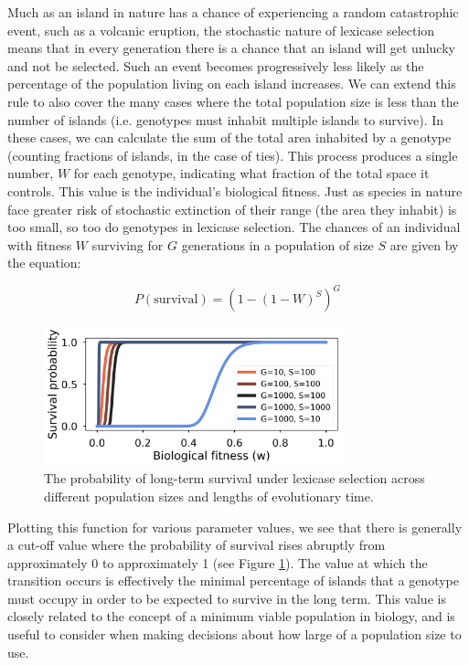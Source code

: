 Much as an island in nature has a chance of experiencing a random catastrophic event, such as a volcanic eruption, the stochastic nature of lexicase selection means that in every generation there is a chance that an island will get unlucky and not be selected. Such an event becomes progressively less likely as the percentage of the population living on each island increases. We can extend this rule to also cover the many cases where the total population size is less than the number of islands (i.e. genotypes must inhabit multiple islands to survive). In these cases, we can calculate the sum of the total area inhabited by a genotype (counting fractions of islands, in the case of ties). This process produces a single number, $W$ for each genotype, indicating what fraction of the total space it controls. This value is the individual's biological fitness. Just as species in nature face greater risk of stochastic extinction of their range (the area they inhabit) is too small, so too do genotypes in lexicase selection. The chances of an individual with fitness $W$ surviving for $G$ generations in a population of size $S$ are given by the equation:

\begin{equation}
P(\text{survival}) = (1 - (1-W)^{S})^{G}
\end{equation}
\begin{figure}
\includegraphics[width=3.4in]{figs/survival.png}
\caption{The probability of long-term survival under lexicase selection across different population sizes and lengths of evolutionary time.}
\label{prob_survival}
\end{figure}

Plotting this function for various parameter values, we see that there is generally a cut-off value where the probability of survival rises abruptly from approximately 0 to approximately 1 (see Figure \ref{prob_survival}). The value at which the transition occurs is effectively the minimal percentage of islands that a genotype must occupy in order to be expected to survive in the long term. This value is closely related to the concept of a minimum viable population in biology, and is useful to consider when making decisions about how large of a population size to use. 

